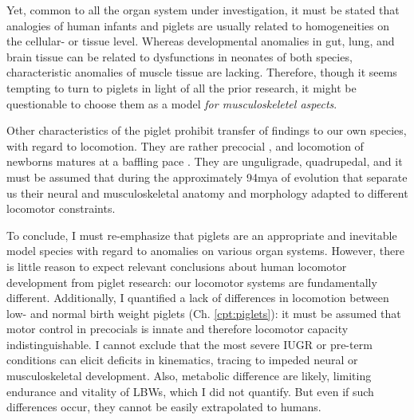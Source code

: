 Yet, common to all the organ system under investigation, it must be stated that analogies of human infants and piglets are usually related to homogeneities on the cellular- or tissue level.
Whereas developmental anomalies in gut, lung, and brain tissue can be related to dysfunctions in neonates of both species, characteristic anomalies of muscle tissue are lacking.
Therefore, though it seems tempting to turn to piglets in light of all the prior research, it might be questionable to choose them as a model \emph{for musculoskeletel aspects}.


Other characteristics of the piglet prohibit transfer of findings to our own species, with regard to locomotion.
They are rather precocial \citep{Wischner2009}, and locomotion of newborns matures at a baffling pace \citep{VandenHole2017,VandenHole2018}.
They are unguligrade, quadrupedal, and it must be assumed that during the approximately 94mya of evolution that separate us \citep{Timetree2017} their neural and musculoskeletal anatomy and morphology adapted to different locomotor constraints.


To conclude, I must re-emphasize that piglets are an appropriate and inevitable model species with regard to anomalies on various organ systems.
However, there is little reason to expect relevant conclusions about human locomotor development from piglet research: our locomotor systems are fundamentally different.
Additionally, I quantified a lack of differences in locomotion between low- and normal birth weight piglets (Ch. \ref{cpt:piglets}): it must be assumed that motor control in precocials is innate and therefore locomotor capacity indistinguishable.
I cannot exclude that the most severe IUGR or pre-term conditions can elicit deficits in kinematics, tracing to impeded neural or musculoskeletal development.
Also, metabolic difference are likely, limiting endurance and vitality of LBWs, which I did not quantify.
But even if such differences occur, they cannot be easily extrapolated to humans.


